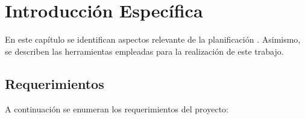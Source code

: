 \chapter{Introducción Específica} %

\label{Chapter2}

En este capítulo se identifican aspectos relevante de la planificación . Asimismo, se describen las herramientas empleadas para la realización de este trabajo.

\section{Requerimientos}
\label{sec:requerimientos}

A continuación se enumeran los requerimientos del proyecto:

